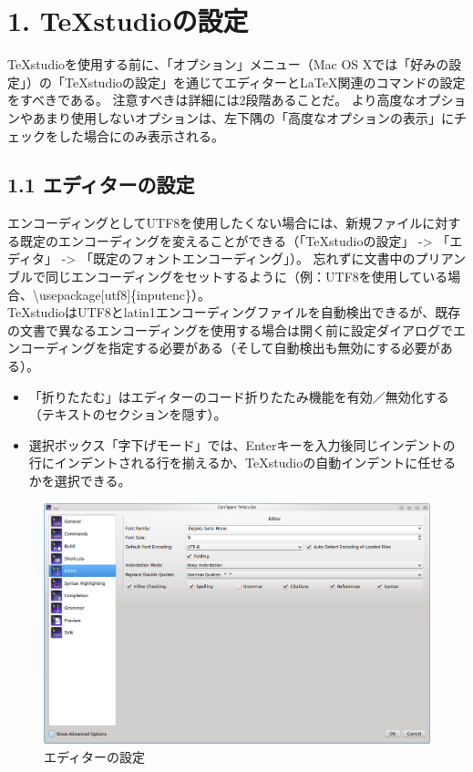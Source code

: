 \documentclass[]{book}
\makeatletter
\def\maxwidth{\ifdim\Gin@nat@width>\linewidth\linewidth
\else\Gin@nat@width\fi}
\let\Oldincludegraphics\includegraphics
\renewcommand{\includegraphics}[1]{\Oldincludegraphics[width=\maxwidth]{#1}}
\makeatother
\begin{document}
\chapter{1. TeXstudioの設定}

TeXstudioを使用する前に、「オプション」メニュー（Mac OS
Xでは「好みの設定」）の「TeXstudioの設定」を通じてエディターとLaTeX関連のコマンドの設定をすべきである。
注意すべきは詳細には2段階あることだ。
より高度なオプションやあまり使用しないオプションは、左下隅の「高度なオプションの表示」にチェックをした場合にのみ表示される。

\section{1.1 エディターの設定}

エンコーディングとしてUTF8を使用したくない場合には、新規ファイルに対する既定のエンコーディングを変えることができる（「TeXstudioの設定」
-\textgreater{} 「エディタ」 -\textgreater{}
「既定のフォントエンコーディング」）。
忘れずに文書中のプリアンブルで同じエンコーディングをセットするように（例：UTF8を使用している場合、\textbackslash{}usepackage{[}utf8{]}\{inputenc\}）。\\
TeXstudioはUTF8とlatin1エンコーディングファイルを自動検出できるが、既存の文書で異なるエンコーディングを使用する場合は開く前に設定ダイアログでエンコーディングを指定する必要がある（そして自動検出も無効にする必要がある）。

\begin{itemize}
\item
  「折りたたむ」はエディターのコード折りたたみ機能を有効／無効化する（テキストのセクションを隠す）。
\item
  選択ボックス「字下げモード」では、Enterキーを入力後同じインデントの行にインデントされる行を揃えるか、TeXstudioの自動インデントに任せるかを選択できる。
\end{itemize}

\begin{figure}[htbp]
\centering
\includegraphics{configure_editor.png}
\caption{エディターの設定}
\end{figure}
\end{document}
